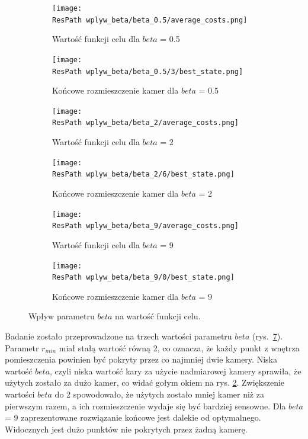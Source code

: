 \documentclass[12pt,a4paper]{article}
\newcommand{\ResPath}{../badania/}
\begin{document}
\afterpage{\clearpage}
\begin{figure}[p]
\captionsetup[subfigure]{aboveskip=-3pt,belowskip=-1pt}
  \begin{subfigure}[b]{0.5\linewidth}
    \centering
    \texttt{[image: \\ResPath wplyw\_beta/beta\_0.5/average\_costs.png]}
    \caption{Wartość funkcji celu dla $beta$ = 0.5}
    \label{fig_beta:a}
  \end{subfigure}%
  \begin{subfigure}[b]{0.5\linewidth}
    \centering
    \texttt{[image: \\ResPath wplyw\_beta/beta\_0.5/3/best\_state.png]}
    \caption{Końcowe rozmieszczenie kamer dla $beta$ = 0.5}
    \label{fig_beta:b}
  \end{subfigure}
  \begin{subfigure}[b]{0.5\linewidth}
    \centering
    \texttt{[image: \\ResPath wplyw\_beta/beta\_2/average\_costs.png]}
    \caption{Wartość funkcji celu dla $beta$ = 2}
    \label{fig_beta:c}
  \end{subfigure}%
  \begin{subfigure}[b]{0.5\linewidth}
    \centering
    \texttt{[image: \\ResPath wplyw\_beta/beta\_2/6/best\_state.png]}
    \caption{Końcowe rozmieszczenie kamer dla $beta$ = 2}
    \label{fig_beta:d}
  \end{subfigure}
    \begin{subfigure}[b]{0.5\linewidth}
    \centering
    \texttt{[image: \\ResPath wplyw\_beta/beta\_9/average\_costs.png]}
    \caption{Wartość funkcji celu dla $beta$ = 9}
    \label{fig_beta:c}
  \end{subfigure}%
  \begin{subfigure}[b]{0.5\linewidth}
    \centering
    \texttt{[image: \\ResPath wplyw\_beta/beta\_9/0/best\_state.png]}
    \caption{Końcowe rozmieszczenie kamer dla $beta$ = 9}
    \label{fig_beta:d}
  \end{subfigure}
  \caption{Wpływ parametru $beta$ na wartość funkcji celu.}
  \label{fig_beta}
\end{figure}
\restoregeometry
Badanie zostało przeprowadzone na trzech wartości parametru $beta$
(rys.\ \ref{fig_beta}). Parametr $r_{min}$ miał stałą wartość równą 2,
co oznacza, że każdy punkt z wnętrza pomieszczenia powinien być pokryty
przez co najmniej dwie kamery. Niska wartość $beta$, czyli niska wartość
kary za użycie nadmiarowej kamery sprawiła, że użytych zostało za dużo
kamer, co widać gołym okiem na rys. \ref{fig_beta:b}. Zwiększenie wartości
$beta$ do 2 spowodowało, że użytych zostało mniej kamer niż za pierwszym razem,
a ich rozmieszczenie wydaje się być bardziej sensowne. Dla $beta$ = 9 zaprezentowane
rozwiązanie końcowe jest dalekie od optymalnego. Widocznych jest dużo punktów
nie pokrytych przez żadną kamerę.
\end{document}
